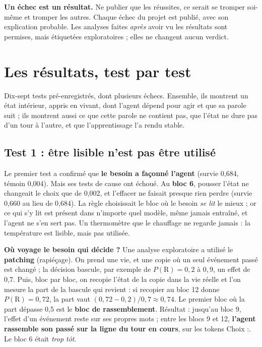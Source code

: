 \documentclass[fontsize=10pt,paper=a4,parskip=half-]{scrartcl}
\newcommand{\lead}[1]{{\fontsize{12}{16.5}\selectfont\color{ink!85!black}#1\par}\vspace{0.3em}}
\newcommand{\q}[1]{\og #1\fg{}}
\begin{document}
\begin{essentiel}
\textbf{Un échec est un résultat.} Ne publier que les réussites, ce serait se tromper
soi-même et tromper les autres. Chaque échec du projet est publié, avec son explication
probable. Les analyses faites \emph{après} avoir vu les résultats sont permises, mais
étiquetées \q{exploratoires} ; elles ne changent aucun verdict.
\end{essentiel}

\section{Les résultats, test par test}
\label{sec:resultats}

\lead{Dix-sept tests pré-enregistrés, dont plusieurs échecs. Ensemble, ils montrent un état
intérieur, appris en vivant, dont l'agent dépend pour agir et que sa parole suit ; ils
montrent aussi ce que cette parole ne contient pas, que l'état ne dure pas d'un tour
à l'autre, et que l'apprentissage l'a rendu stable.}

\subsection{Test 1 : être lisible n'est pas être utilisé}
Le premier test a confirmé que \textbf{le besoin a façonné l'agent} (survie 0,684, témoin
0,004). Mais ses tests de cause ont échoué. Au \textbf{bloc 6}, pousser l'état ne changeait
le choix que de 0,002, et l'effacer ne faisait presque rien perdre (survie 0,660 au lieu
de 0,684). La règle choisissait le bloc où le besoin \emph{se lit} le mieux ; or ce qui
s'y lit est présent dans n'importe quel modèle, même jamais entraîné, et l'agent ne s'en
sert pas. Un thermomètre que le chauffage ne regarde jamais : la température est lisible,
mais pas utilisée.

\textbf{Où voyage le besoin qui décide ?} Une analyse exploratoire a utilisé le
\textbf{patching} (\q{rapiéçage}). On prend une vie, et une copie où un seul événement passé
est changé ; la décision bascule, par exemple de $P(\text{R}) = 0,2$ à $0,9$, un effet de
0,7. Puis, bloc par bloc, on recopie l'état de la copie dans la vie réelle et l'on mesure
la part de la bascule qui revient : si recopier au bloc 12 donne $P(\text{R}) = 0,72$, la
part vaut $(0,72-0,2)/0,7 \approx 0,74$. Le premier bloc où la part dépasse 0,5 est le
\textbf{bloc de rassemblement}. Résultat : jusqu'au bloc 9, l'effet d'un événement reste sur
ses propres mots ; entre les blocs 9 et 12, \textbf{l'agent rassemble son passé sur la ligne
du tour en cours}, sur les tokens \q{Choix :}. Le bloc 6 était \emph{trop tôt}.
\end{document}
